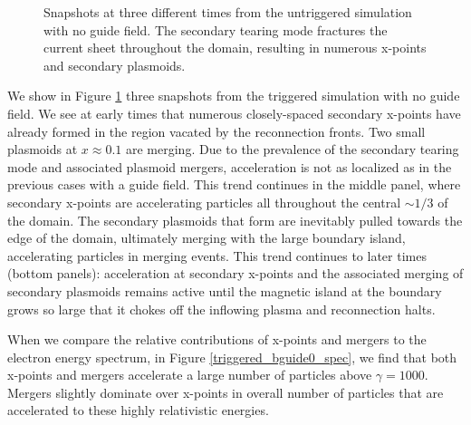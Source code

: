 \documentclass[iop,twocolappendix]{emulateapj}
\begin{document}
\begin{figure}[htp]
	\caption{Snapshots at three different times from the untriggered simulation with no guide field.  The secondary tearing mode fractures the current sheet throughout the domain, resulting in numerous x-points and secondary plasmoids.  
	}
	\label{triggered_bguide0_snapshots}
\end{figure}

We show in Figure \ref{triggered_bguide0_snapshots} three snapshots from the triggered simulation with no guide field.  We see at early times that numerous closely-spaced secondary x-points have already formed in the region vacated by the reconnection fronts.  Two small plasmoids at $x\approx 0.1$ are merging.  Due to the prevalence of the secondary tearing mode and associated plasmoid mergers, acceleration is not as localized as in the previous cases with a guide field.  This trend continues in the middle panel, where secondary x-points are accelerating particles all throughout the central $\sim 1/3$ of the domain.  The secondary plasmoids that form are inevitably pulled towards the edge of the domain, ultimately merging with the large boundary island, accelerating particles in merging events.  This trend continues to later times (bottom panels): acceleration at secondary x-points and the associated merging of secondary plasmoids remains active until the magnetic island at the boundary grows so large that it chokes off the inflowing plasma and reconnection halts.  

When we compare the relative contributions of x-points and mergers to the electron energy spectrum, in Figure \ref{triggered_bguide0_spec}, we find that both x-points and mergers accelerate a large number of particles above $\gamma=1000$.  Mergers slightly dominate over x-points in overall number of particles that are accelerated to these highly relativistic energies.
\end{document}

